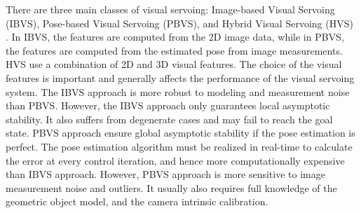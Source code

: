 There are three main classes of visual servoing: Image-based Visual Servoing (IBVS), Pose-based Visual Servoing (PBVS), and Hybrid Visual Servoing (HVS) \cite{chaumette2006visual}\cite{chaumette2007visual}. In IBVS, the features are computed from the 2D image data, while in PBVS, the features are computed from the estimated pose from image measurements. HVS use a combination of 2D and 3D visual features. The choice of the visual features is important and generally affects the performance of the visual servoing system. The IBVS approach is more robust to modeling and measurement noise than PBVS. However, the IBVS approach only guarantees local asymptotic stability. It also suffers from degenerate cases and may fail to reach the goal state. PBVS approach ensure global asymptotic stability if the pose estimation is perfect. The pose estimation algorithm must be realized in real-time to calculate the error at every control iteration, and hence more computationally expensive than IBVS approach. However, PBVS approach is more sensitive to image measurement noise and outliers. It usually also requires full knowledge of the geometric object model, and the camera intrinsic calibration.
